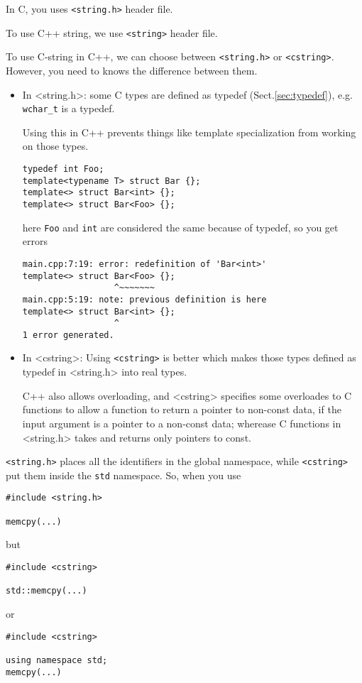 In C, you uses \verb!<string.h>! header file.


To use C++ string, we use \verb!<string>! header file.


To use C-string in C++, we can choose between \verb!<string.h>! or
\verb!<cstring>!. However, you need to knows the difference between them.
\begin{itemize}
  \item In <string.h>: some C types are defined as typedef
  (Sect.\ref{sec:typedef}), e.g. \verb!wchar_t! is a typedef.
  
  Using this in C++ prevents things like template specialization from working on
  those types. 
 
\begin{lstlisting}
typedef int Foo;
template<typename T> struct Bar {};
template<> struct Bar<int> {};
template<> struct Bar<Foo> {};
\end{lstlisting}
here \verb!Foo! and \verb!int! are considered the same because of typedef, so
you get errors
\begin{verbatim}
main.cpp:7:19: error: redefinition of 'Bar<int>'
template<> struct Bar<Foo> {};
                  ^~~~~~~~
main.cpp:5:19: note: previous definition is here
template<> struct Bar<int> {};
                  ^
1 error generated.
\end{verbatim}
  
  \item In <cstring>:
  Using \verb!<cstring>! is better which makes those types defined as
  typedef in <string.h> into real types.
  
  C++ also allows overloading, and <cstring> specifies some overloades to C
  functions to allow a function to return a pointer to non-const data, if the
  input argument is a pointer to a non-const data; wherease C functions in
  <string.h> takes and returns only pointers to const. 
  
\end{itemize}


\verb!<string.h>! places all the identifiers in the global namespace, while
\verb!<cstring>! put them inside the \verb!std! namespace.
So, when you use 
\begin{verbatim}
#include <string.h>

memcpy(...)
\end{verbatim}
but
\begin{verbatim}
#include <cstring>

std::memcpy(...)
\end{verbatim}
or 
\begin{verbatim}
#include <cstring>

using namespace std;
memcpy(...)
\end{verbatim}

